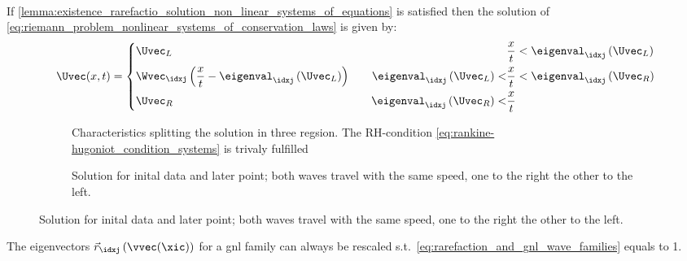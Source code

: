 \begin{defnbox}\nospacing
    \begin{defn}
        \label{defn:rarefaction_solution_non_linear_systems_of_equations}\leavevmode\\
        If \cref{lemma:existence_rarefactio_solution_non_linear_systems_of_equations} is satisfied then the solution of \cref{eq:riemann_problem_nonlinear_systems_of_conservation_laws} is given by:
        \begin{align}
          \Uvec(x,t)=
          \left\{\begin{alignedat}{5}
              &\Uvec_{L}&&&&\frac{x}{t}<\eigenval_{\idxj}\left(\Uvec_{L}\right) \\
              &\Wvec_{\idxj}\left(\frac{x}{t}-\eigenval_{\idxj}\left(\Uvec_{L}\right)\right)&&\qquad&\eigenval_{\idxj}\left(\Uvec_{L}\right)<&\frac{x}{t}<\eigenval_{\idxj}\left(\Uvec_{R}\right) \\
              &\Uvec_{R}&&&\eigenval_{\idxj}\left(\Uvec_{R}\right)<&\frac{x}{t}
          \end{alignedat}\right.\label{eq:rarefaction_solution_non_linear_systems_of_equations}
        \end{align}
        \begin{figure}[H]
            \centering
            \begin{subfigure}{.5\columnwidth}
                \centering{
                \def\svgwidth{120pt}
              \resizebox{\linewidth}{!}{}}
                \caption{Characteristics splitting the solution in three regsion. The RH-condition \cref{eq:rankine-hugoniot_condition_systems} is trivaly fulfilled}
            \end{subfigure}%
            \hfill
            \begin{subfigure}[t]{.45\columnwidth}
                \centering{
                  \def\svgwidth{120pt}
              \resizebox{\linewidth}{!}{}
                }
                \caption{Solution for inital data and later point; both waves travel with the same speed, one to the right the other to the left.}
            \end{subfigure}
        \end{figure}
    \end{defn}
\end{defnbox}
\begin{notebox}[Note]\nospacing
    The eigenvectors $\vec{r}_{\idxj}\left(\vvec(\xic)\right)$ for a gnl family can always be rescaled s.t.\ \cref{eq:rarefaction_and_gnl_wave_families} equals to 1.
\end{notebox}
